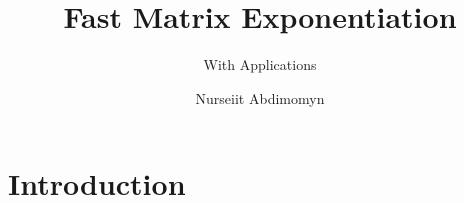 \documentclass{beamer}
\title{Fast Matrix Exponentiation}
\subtitle{With Applications}
\institute{UNIST}
\author{Nurseiit Abdimomyn}
\begin{document}
\begin{frame}
	\titlepage
\end{frame}

\iffalse
    \begin{frame}{Table of contents}
      \tableofcontents
    \end{frame}

    \begin{frame}{Introduction}
    	\begin{block}{\LaTeX\ Beamer}
    		LaTeX Beamer is a powerful tool to create presentations
    	\end{block}    	
    	\begin{block}{Export to PDF}
    		It produces platform-independent presentations in PDF
    	\end{block}	
    \end{frame}
\fi

\section{Introduction}

\iffalse
    \begin{frame}{Blocks}
    	\begin{block}{This is block}
    		Using \textit{blocks} is a handy way to present your text
    	\end{block}    	
    	\begin{block}{Pause between}
    		You can also insert a pause between blocks
    	\end{block}	
    \end{frame}
\fi
\end{document}
